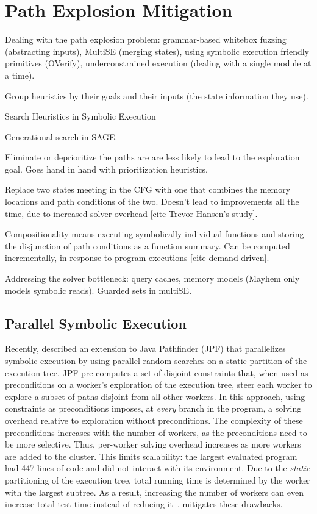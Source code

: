 \section{Path Explosion Mitigation}

Dealing with the path explosion problem: grammar-based whitebox fuzzing (abstracting inputs), MultiSE (merging states), using symbolic execution friendly primitives (OVerify), underconstrained execution (dealing with a single module at a time).

Group heuristics by their goals and their inputs (the state information they use).

Search Heuristics in Symbolic Execution

Generational search in SAGE.

Eliminate or deprioritize the paths are are less likely to lead to the exploration goal.  Goes hand in hand with prioritization heuristics.

Replace two states meeting in the CFG with one that combines the memory locations and path conditions of the two.  Doesn't lead to improvements all the time, due to increased solver overhead [cite Trevor Hansen's study].

Compositionality means executing symbolically individual functions and storing the disjunction of path conditions as a function summary.  Can be computed incrementally, in response to program executions [cite demand-driven].

Addressing the solver bottleneck: query caches, memory models (Mayhem only models symbolic reads). Guarded sets in multiSE.

\subsection{Parallel Symbolic Execution}

Recently, \cite{parallelSymbex} described an extension to Java Pathfinder (JPF) that parallelizes symbolic execution by using parallel random searches on a static partition of the execution tree.  JPF pre-computes a set of disjoint constraints that, when used as preconditions on a worker's exploration of the execution tree, steer each worker to explore a subset of paths disjoint from all other workers.  In this approach, using constraints as preconditions imposes, at {\em every} branch in the program, a solving overhead relative to exploration without preconditions.  The complexity of these preconditions increases with the number of workers, as the preconditions need to be more selective.  Thus, per-worker solving overhead increases as more workers are added to the cluster.  This limits scalability: the largest evaluated program had 447 lines of code and did not interact with its environment.  Due to the {\em static} partitioning of the execution tree, total running time is determined by the worker with the largest subtree.  As a result, increasing the number of workers can even increase total test time instead of reducing it~\cite{parallelSymbex}.  \cnine mitigates these drawbacks.

